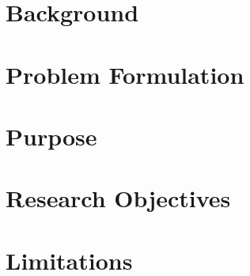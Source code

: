 

\section{Background}
\label{sec:background}


\section{Problem Formulation}
\label{sec:problemformulation}


\section{Purpose}
\label{sec:purpose}
%

\section{Research Objectives}
\label{sec:researchobjectives}


\section{Limitations}
\label{sec:limitations}


